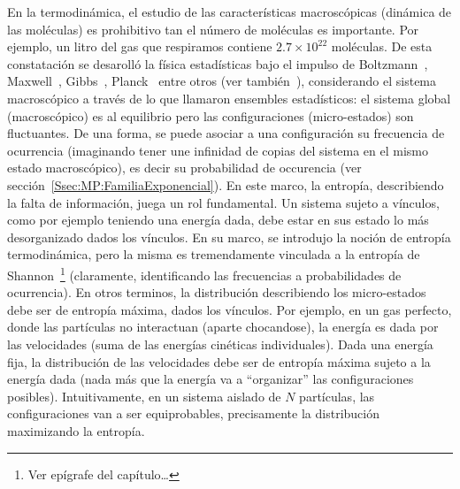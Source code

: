 \label{Sec:SZ:Ejemplos}


\label{Ssec:SZ:MaxEnt}

En  la  termodin\'amica, el  estudio  de  las caracter\'isticas  macrosc\'opicas
(din\'amica de las mol\'eculas) es prohibitivo tan el n\'umero de mol\'eculas es
importante. Por  ejemplo, un litro del  gas que respiramos  contiene $2.7 \times
10^{22}$  mol\'eculas.   De  esta  constataci\'on  se  desaroll\'o  la  f\'isica
estad\'isticas    bajo   el    impulso    de   Boltzmann~\cite{Bol96,    Bol98},
Maxwell~\cite{Max67},  Gibbs~\cite{Gib02}, Planck~\cite{Pla15} entre  otros (ver
tambi\'en~\cite[y   ref.]{Jay65,  Mer10,   Mer18}),   considerando  el   sistema
macrosc\'opico  a  trav\'es de  lo  que  llamaron  ensembles estad\'isticos:  el
sistema  global  (macrosc\'opico)  es  al equilibrio  pero  las  configuraciones
(micro-estados)  son  fluctuantes.   De  una  forma,  se  puede  asociar  a  una
configuraci\'on su  frecuencia de ocurrencia (imaginando tener  une infinidad de
copias del sistema en el  mismo estado macrosc\'opico), es decir su probabilidad
de occurencia (ver  secci\'on~\ref{Ssec:MP:FamiliaExponencial}).  En este marco,
la entrop\'ia, describiendo la falta de informaci\'on, juega un rol fundamental.
Un sistema  sujeto a v\'inculos, como  por ejemplo teniendo  una energ\'ia dada,
debe estar  en sus estado  lo m\'as desorganizado  dados los v\'inculos.   En su
marco, se introdujo la noci\'on  de entrop\'ia termodin\'amica, pero la misma es
tremendamente vinculada a la  entrop\'ia de Shannon~\footnote{Ver ep\'igrafe del
  cap\'itulo\ldots} (claramente, identificando  las frecuencias a probabilidades
de  ocurrencia).    En  otros  terminos,  la   distribuci\'on  describiendo  los
micro-estados  debe  ser de  entrop\'ia  m\'axima,  dados  los v\'inculos.   Por
ejemplo,  en un  gas perfecto,  donde  las part\'iculas  no interactuan  (aparte
chocandose), la  energ\'ia es dada por  las velocidades (suma  de las energ\'ias
cin\'eticas individuales).   Dada una energ\'ia  fija, la distribuci\'on  de las
velocidades debe  ser de  entrop\'ia m\'axima sujeto  a la energ\'ia  dada (nada
m\'as  que  la  energ\'ia  va  a ``organizar''  las  configuraciones  posibles).
Intuitivamente, en  un sistema aislado de $N$  part\'iculas, las configuraciones
van  a   ser  equiprobables,  precisamente  la   distribuci\'on  maximizando  la
entrop\'ia.   

